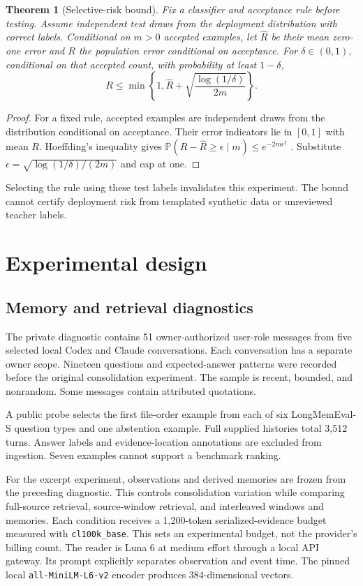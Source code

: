 \documentclass[11pt]{article}
\newtheorem{theorem}{Theorem}
\newcommand{\Prob}{\mathbb{P}}
\begin{document}
\begin{theorem}[Selective-risk bound]
Fix a classifier and acceptance rule before testing. Assume independent test draws from the deployment distribution with correct labels. Conditional on $m>0$ accepted examples, let $\widehat R$ be their mean zero-one error and $R$ the population error conditional on acceptance. For $\delta\in(0,1)$, conditional on that accepted count, with probability at least $1-\delta$,
\[
 R\leq\min\left\{1,\widehat R+
 \sqrt{\frac{\log(1/\delta)}{2m}}\right\}.
\]
\end{theorem}
\begin{proof}
For a fixed rule, accepted examples are independent draws from the distribution conditional on acceptance. Their error indicators lie in $[0,1]$ with mean $R$. Hoeffding's inequality gives
$\Prob(R-\widehat R\geq\epsilon\mid m)\leq e^{-2m\epsilon^2}$ \citep{hoeffding}.
Substitute $\epsilon=\sqrt{\log(1/\delta)/(2m)}$ and cap at one.
\end{proof}
Selecting the rule using these test labels invalidates this experiment. The bound cannot certify deployment risk from templated synthetic data or unreviewed teacher labels.

\section{Experimental design}
\subsection{Memory and retrieval diagnostics}
The private diagnostic contains 51 owner-authorized user-role messages from five selected local Codex and Claude conversations. Each conversation has a separate owner scope. Nineteen questions and expected-answer patterns were recorded before the original consolidation experiment. The sample is recent, bounded, and nonrandom. Some messages contain attributed quotations.

A public probe selects the first file-order example from each of six LongMemEval-S question types and one abstention example. Full supplied histories total 3,512 turns. Answer labels and evidence-location annotations are excluded from ingestion. Seven examples cannot support a benchmark ranking.

For the excerpt experiment, observations and derived memories are frozen from the preceding diagnostic. This controls consolidation variation while comparing full-source retrieval, source-window retrieval, and interleaved windows and memories. Each condition receives a 1,200-token serialized-evidence budget measured with \texttt{cl100k\_base}. This sets an experimental budget, not the provider's billing count. The reader is Luna 6 at medium effort through a local API gateway. Its prompt explicitly separates observation and event time. The pinned local \texttt{all-MiniLM-L6-v2} encoder produces 384-dimensional vectors.
\end{document}
